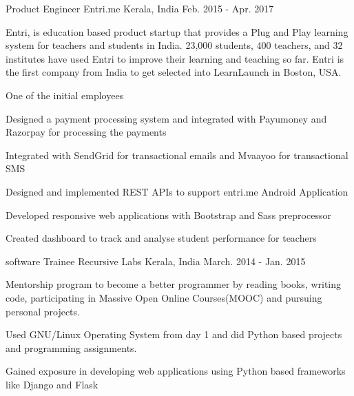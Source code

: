 \begin{cvexperiences}

  \cvexperience
    {Product Engineer} %
    {Entri.me} %
    {Kerala, India} %
    {Feb. 2015 - Apr. 2017} %
    {\begin{cvparagraph} %
      Entri, is education based product startup that provides a Plug and Play learning system for teachers and students in India. 23,000 students, 400 teachers, and 32 institutes have used Entri to improve their learning and teaching so far. Entri is the first company from India to get selected into LearnLaunch in Boston, USA.
\end{cvparagraph}
}    {
      \begin{cvitems} %
        \item {One of the initial employees}
        \item {Designed a payment processing system and integrated with Payumoney and Razorpay for processing the payments}
        \item{Integrated with SendGrid for transactional emails and Mvaayoo for transactional SMS}
        \item{Designed and implemented REST APIs to support entri.me Android Application}
        \item{Developed responsive web applications with Bootstrap and Sass preprocessor}
        \item{Created dashboard to track and analyse student performance for teachers}
      \end{cvitems}
    }

  \cvexperience
    {software Trainee} %
    {Recursive Labs} %
    {Kerala, India} %
    {March. 2014 - Jan. 2015} %
    {\begin{cvparagraph} %
      Mentorship program to become a better programmer by reading books, writing code, participating in Massive Open Online Courses(MOOC) and pursuing personal projects.
\end{cvparagraph}
}
    {
      \begin{cvitems} %
        \item {Used GNU/Linux Operating System from day 1 and did Python based projects and programming assignments.}
        \item {Gained exposure in developing web applications using Python based frameworks like Django and Flask}
      \end{cvitems}
    }

\end{cvexperiences}
\vspace{19mm}
